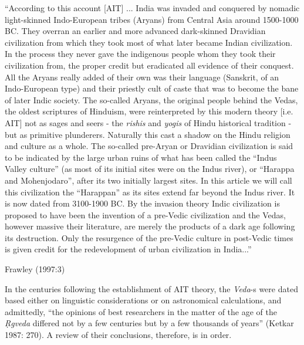 \begin{myquote}
“According to this account [AIT] ... India was invaded and conquered by nomadic light-skinned Indo-European tribes (Aryans) from Central Asia around 1500-1000 BC. They overran an earlier and more advanced dark-skinned Dravidian civilization from which they took most of what later became Indian civilization. In the process they never gave the indigenous people whom they took their civilization from, the proper credit but eradicated all evidence of their conquest. All the Aryans really added of their own was their language (Sanskrit, of an Indo-European type) and their priestly cult of caste that was to become the bane of later Indic society. The so-called Aryans, the original people behind the Vedas, the oldest scriptures of Hinduism, were reinterpreted by this modern theory [i.e. AIT] not as sages and seers - the {\sl rishis} and {\sl yogis} of Hindu historical tradition - but as primitive plunderers. Naturally this cast a shadow on the Hindu religion and culture as a whole. The so-called pre-Aryan or Dravidian civilization is said to be indicated by the large urban ruins of what has been called the “Indus Valley culture” (as most of its initial sites were on the Indus river), or “Harappa and Mohenjodaro”, after its two initially largest sites. In this article we will call this civilization the “Harappan” as its sites extend far beyond the Indus river. It is now dated from 3100-1900 BC. By the invasion theory Indic civilization is proposed to have been the invention of a pre-Vedic civilization and the Vedas, however massive their literature, are merely the products of a dark age following its destruction. Only the resurgence of the pre-Vedic culture in post-Vedic times is given credit for the redevelopment of urban civilization in India...”

\hfill Frawley (1997:3)
\end{myquote}

In the centuries following the establishment of AIT theory, the {\sl Veda}-s were dated based either on linguistic considerations or on astronomical calculations, and admittedly, “the opinions of best researchers in the matter of the age of the {\sl Ṛgveda} differed not by a few centuries but by a few thousands of years” (Ketkar 1987: 270). A review of their conclusions, therefore, is in order. 

